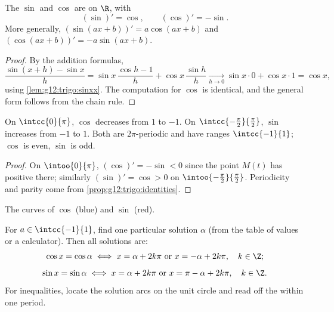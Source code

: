 \begin{theorem}\label{thm:g12:trigo:derivatives}
The  $\sin$ and $\cos$ are  on $\R$, with
\[
(\sin)' = \cos, \qquad (\cos)' = -\sin .
\]
More generally, $(\sin(ax+b))' = a\cos(ax+b)$ and
$(\cos(ax+b))' = -a\sin(ax+b)$.
\end{theorem}

\begin{proof}
By the addition formulas,
\[
\frac{\sin(x+h) - \sin x}{h}
= \sin x\,\frac{\cos h - 1}{h} + \cos x\,\frac{\sin h}{h}
\xrightarrow[h\to0]{} \sin x \cdot 0 + \cos x \cdot 1 = \cos x,
\]
using \cref{lem:g12:trigo:sinxx}. The computation for $\cos$ is identical,
and the general form follows from the chain rule.
\end{proof}

\begin{proposition}[Variations]\label{prop:g12:trigo:variations}
On $\intcc{0}{\pi}$, $\cos$ decreases from $1$ to $-1$. On
$\intcc{-\frac\pi2}{\frac\pi2}$, $\sin$ increases from $-1$ to $1$. Both
 are $2\pi$-periodic and have ranges $\intcc{-1}{1}$; $\cos$ is
even, $\sin$ is odd.
\end{proposition}

\begin{proof}
On $\intoo{0}{\pi}$, $(\cos)' = -\sin < 0$ since the point $M(t)$ has
positive  there; similarly $(\sin)' = \cos > 0$ on
$\intoo{-\frac\pi2}{\frac\pi2}$. Periodicity and parity come from
\cref{prop:g12:trigo:identities}.
\end{proof}

\begin{omfigure}

{\small The curves of $\cos$ (blue) and $\sin$ (red).}
\end{omfigure}

\begin{method}[Solving $\cos x = a$ and $\sin x = a$]\label{met:g12:trigo:equations}
For $a \in \intcc{-1}{1}$, find one particular solution $\alpha$ (from the
table of values or a calculator). Then all solutions are:
\[
\cos x = \cos\alpha \iff x = \alpha + 2k\pi \text{ or } x = -\alpha + 2k\pi,
\quad k \in \Z;
\]
\[
\sin x = \sin\alpha \iff x = \alpha + 2k\pi \text{ or } x = \pi - \alpha + 2k\pi,
\quad k \in \Z.
\]
For inequalities, locate the solution arcs on the unit circle and read off
the  within one period.
\end{method}

